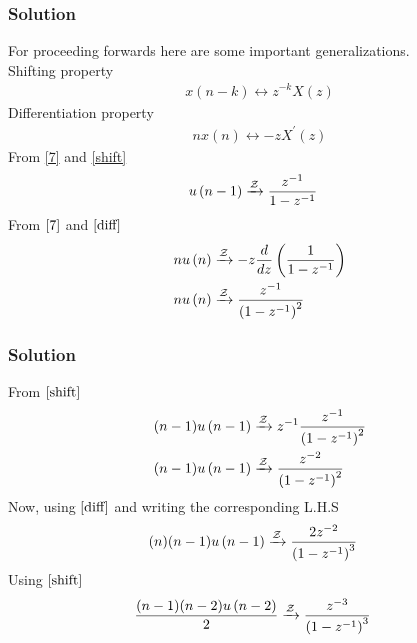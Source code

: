 \documentclass{beamer}
\begin{document}
\begin{frame}
\frametitle{Solution}
For proceeding forwards here are some important generalizations.\\
Shifting property
\begin{align}
x(n-k) \leftrightarrow z^{-k} X(z) \label{shift}
\end{align}
Differentiation property
\begin{align}
nx(n) \leftrightarrow -zX^{\prime}(z) \label{diff}
\end{align}
From \eqref{7} and \eqref{shift}
\begin{align}
u\left(n-1\right) &\xrightarrow{\mathcal{Z}} \frac{z^{-1}}{1-z^{-1}} \label{21}
\end{align}
From $\eqref{7}$ and $\eqref{diff}$
\begin{align}
nu\left(n\right) &\xrightarrow{\mathcal{Z}} -z\frac{d}{dz}\left(\frac{1}{1-z^{-1}}\right)\\
nu\left(n\right)    &\xrightarrow{\mathcal{Z}} \frac{z^{-1}}{\left(1-z^{-1}\right)^{2}}
\end{align}
    
\end{frame}












\begin{frame}
\frametitle{Solution}
From $\eqref{shift}$
\begin{align}
(n-1)u\left(n-1\right)    &\xrightarrow{\mathcal{Z}} z^{-1}\frac{z^{-1}}{\left(1-z^{-1}\right)^{2}}\\
(n-1)u\left(n-1\right)    &\xrightarrow{\mathcal{Z}} \frac{z^{-2}}{\left(1-z^{-1}\right)^{2}} \label{22}
\end{align}
Now, using $\eqref{diff}$ and writing the corresponding L.H.S
\begin{align}   
(n)(n-1)u\left(n-1\right)    &\xrightarrow{\mathcal{Z}} \frac{2z^{-2}}{\left(1-z^{-1}\right)^3} 
\end{align}
Using $\eqref{shift}$
\begin{align}
    \frac{(n-1)(n-2)u\left(n-2\right)}{2}    &\xrightarrow{\mathcal{Z}} \frac{z^{-3}}{\left(1-z^{-1}\right)^3} \label{23} 
\end{align}
\end{frame}
\end{document}
